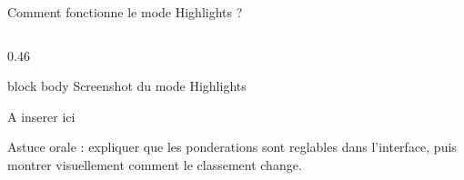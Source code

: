 \documentclass[aspectratio=169, 11pt]{beamer}
\begin{document}
\begin{frame}{Comment fonctionne le mode Highlights ?}
\begin{columns}[T,onlytextwidth]
        \begin{column}{0.46\textwidth}
            \vspace{0.2cm}
            \begin{beamercolorbox}[wd=\linewidth,ht=0.68\textheight,dp=0.2cm,center,rounded=true,shadow=true]{block body}
                \vfill
                {\Large Screenshot du mode Highlights}

                \vspace{0.3cm}
                {\normalsize A inserer ici}
                \vfill
            \end{beamercolorbox}

            \vspace{0.2cm}
            {\scriptsize
            Astuce orale : expliquer que les ponderations sont reglables dans l'interface,
            puis montrer visuellement comment le classement change.}
        \end{column}
    \end{columns}
\end{frame}
\end{document}
